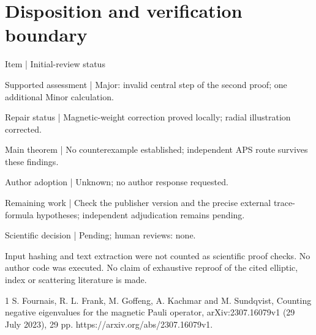 \documentclass[10pt]{article}
\begin{document}
\section*{Disposition and verification boundary}
Item | Initial-review status\par
Supported assessment | Major: invalid central step of the second proof; one additional Minor calculation.\par
Repair status | Magnetic-weight correction proved locally; radial illustration corrected.\par
Main theorem | No counterexample established; independent APS route survives these findings.\par
Author adoption | Unknown; no author response requested.\par
Remaining work | Check the publisher version and the precise external trace-formula hypotheses; independent adjudication remains pending.\par
Scientific decision | Pending; human reviews: none.\par
Input hashing and text extraction were not counted as scientific proof checks. No author code was executed. No claim of exhaustive reproof of the cited elliptic, index or scattering literature is made.\par
1 S. Fournais, R. L. Frank, M. Goffeng, A. Kachmar and M. Sundqvist, Counting negative eigenvalues for the magnetic Pauli operator, arXiv:2307.16079v1 (29 July 2023), 29 pp. https://arxiv.org/abs/2307.16079v1.\par
\end{document}
